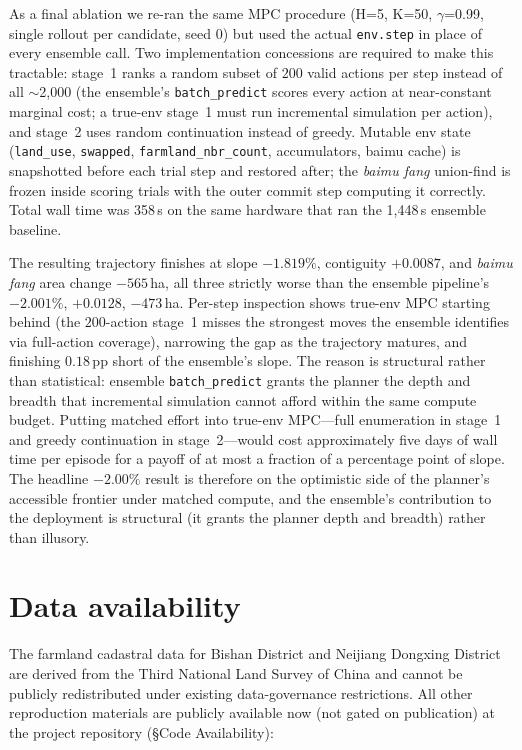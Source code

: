 \documentclass[11pt]{article}
\begin{document}
As a final ablation we re-ran the same MPC procedure (H=5, K=50, $\gamma$=0.99, single rollout per candidate, seed 0) but used the actual \texttt{env.step} in place of every ensemble call. Two implementation concessions are required to make this tractable: stage~1 ranks a random subset of $200$ valid actions per step instead of all $\sim$2{,}000 (the ensemble's \texttt{batch\_predict} scores every action at near-constant marginal cost; a true-env stage~1 must run incremental simulation per action), and stage~2 uses random continuation instead of greedy. Mutable env state (\texttt{land\_use}, \texttt{swapped}, \texttt{farmland\_nbr\_count}, accumulators, baimu cache) is snapshotted before each trial step and restored after; the \textit{baimu fang} union-find is frozen inside scoring trials with the outer commit step computing it correctly. Total wall time was 358\,s on the same hardware that ran the 1{,}448\,s ensemble baseline.

The resulting trajectory finishes at slope $-1.819\%$, contiguity $+0.0087$, and \textit{baimu fang} area change $-565$\,ha, all three strictly worse than the ensemble pipeline's $-2.001\%$, $+0.0128$, $-473$\,ha. Per-step inspection shows true-env MPC starting behind (the $200$-action stage~1 misses the strongest moves the ensemble identifies via full-action coverage), narrowing the gap as the trajectory matures, and finishing $0.18$\,pp short of the ensemble's slope. The reason is structural rather than statistical: ensemble \texttt{batch\_predict} grants the planner the depth and breadth that incremental simulation cannot afford within the same compute budget. Putting matched effort into true-env MPC---full enumeration in stage~1 and greedy continuation in stage~2---would cost approximately five days of wall time per episode for a payoff of at most a fraction of a percentage point of slope. The headline $-2.00\%$ result is therefore on the optimistic side of the planner's accessible frontier under matched compute, and the ensemble's contribution to the deployment is structural (it grants the planner depth and breadth) rather than illusory.

\section*{Data availability}
The farmland cadastral data for Bishan District and Neijiang Dongxing District are derived from the Third National Land Survey of China and cannot be publicly redistributed under existing data-governance restrictions. All other reproduction materials are publicly available now (not gated on publication) at the project repository (\S Code Availability):
\end{document}
